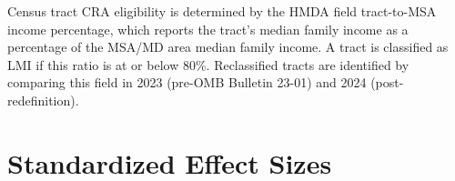 \documentclass[12pt]{article}
\begin{document}
Census tract CRA eligibility is determined by the HMDA field tract-to-MSA income percentage, which reports the tract's median family income as a percentage of the MSA/MD area median family income. A tract is classified as LMI if this ratio is at or below 80\%. Reclassified tracts are identified by comparing this field in 2023 (pre-OMB Bulletin 23-01) and 2024 (post-redefinition).

\section{Standardized Effect Sizes}
\label{sec:sde}


\end{document}
